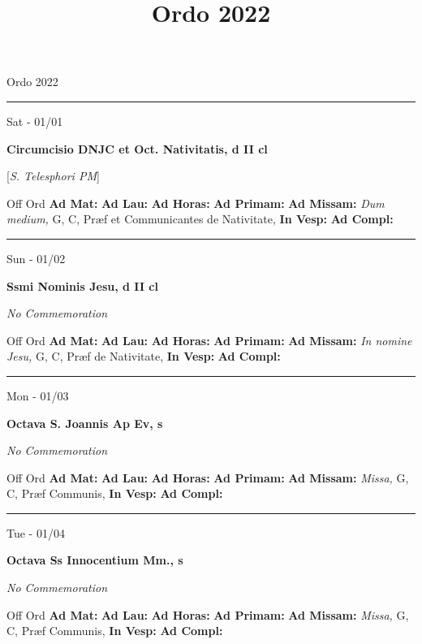 \documentclass[letterpaper, 10pt]{article}
\title{Ordo 2022}
\begin{document}
\begin{center}
\Huge Ordo 2022\end{center}

\hrule
\begin{center}
Sat - 01/01
\end{center}\textbf{ \large Circumcisio DNJC et Oct. Nativitatis, \textnormal{\normalsize d II cl}}

[\textit{S. Telesphori PM}]
\begin{justify}
Off Ord
\textbf{Ad Mat: }
\textbf{Ad Lau: }
\textbf{Ad Horas: }
\textbf{Ad Primam: }
\textbf{Ad Missam:} \textit{Dum medium, } G, C, Præf et Communicantes de Nativitate, 
\textbf{In Vesp: }
\textbf{Ad Compl: }\end{justify}



\hrule
\begin{center}
Sun - 01/02
\end{center}\textbf{ \large Ssmi Nominis Jesu, \textnormal{\normalsize d II cl}}

\textit{No Commemoration}\begin{justify}
Off Ord
\textbf{Ad Mat: }
\textbf{Ad Lau: }
\textbf{Ad Horas: }
\textbf{Ad Primam: }
\textbf{Ad Missam:} \textit{In nomine Jesu, } G, C, Præf de Nativitate, 
\textbf{In Vesp: }
\textbf{Ad Compl: }\end{justify}



\hrule
\begin{center}
Mon - 01/03
\end{center}\textbf{ \large Octava S. Joannis Ap Ev, \textnormal{\normalsize s}}

\textit{No Commemoration}\begin{justify}
Off Ord
\textbf{Ad Mat: }
\textbf{Ad Lau: }
\textbf{Ad Horas: }
\textbf{Ad Primam: }
\textbf{Ad Missam:} \textit{Missa, } G, C, Præf Communis, 
\textbf{In Vesp: }
\textbf{Ad Compl: }\end{justify}



\hrule
\begin{center}
Tue - 01/04
\end{center}\textbf{ \large Octava Ss Innocentium Mm., \textnormal{\normalsize s}}

\textit{No Commemoration}\begin{justify}
Off Ord
\textbf{Ad Mat: }
\textbf{Ad Lau: }
\textbf{Ad Horas: }
\textbf{Ad Primam: }
\textbf{Ad Missam:} \textit{Missa, } G, C, Præf Communis, 
\textbf{In Vesp: }
\textbf{Ad Compl: }\end{justify}
\end{document}
